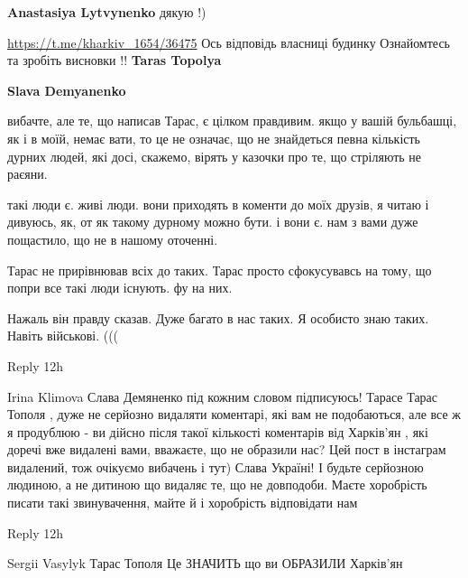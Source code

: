 \begin{itemize}
\begin{itemize}
\textbf{Anastasiya Lytvynenko} дякую !)

\url{https://t.me/kharkiv_1654/36475}
Ось відповідь власниці будинку
Ознайомтесь та зробіть висновки !!
\textbf{Taras Topolya}


\textbf{Slava Demyanenko} 

вибачте, але те, що написав Тарас, є цілком правдивим. якщо у вашій бульбашці,
як і в моїй, немає вати, то це не означає, що не знайдеться певна кількість
дурних людей, які досі, скажемо, вірять у казочки про те, що стріляють не
раєяни.

такі люди є. живі люди. вони приходять в коменти до моїх друзів, я читаю і
дивуюсь, як, от як такому дурному можно бути. і вони є.  нам з вами дуже
пощастило, що не в нашому оточенні.

Тарас не прирівнював всіх до таких. Тарас просто сфокусувавсь на тому, що попри
все такі люди існують. фу на них.

Нажаль він правду сказав. Дуже багато в нас таких. Я особисто знаю таких. Навіть військові. (((

    Reply
    12h

Irina Klimova
Слава Демяненко під кожним словом підписуюсь! Тарасе Тарас Тополя , дуже не серйозно видаляти коментарі, які вам не подобаються, але все ж я продублюю - ви дійсно після такої кількості коментарів від Харків’ян , які доречі вже видалені вами, вважаєте, що не образили нас? Цей пост в інстаграм видалений, тож очікуємо вибачень і тут) Слава Україні! І будьте серйозною людиною, а не дитиною що видаляє те, що не довподоби. Маєте хоробрість писати такі звинувачення, майте й і хоробрість відповідати нам

    Reply
    12h

Sergii Vasylyk
Тарас Тополя Це ЗНАЧИТЬ що ви ОБРАЗИЛИ Харків'ян

\end{itemize} %

\end{itemize} %
